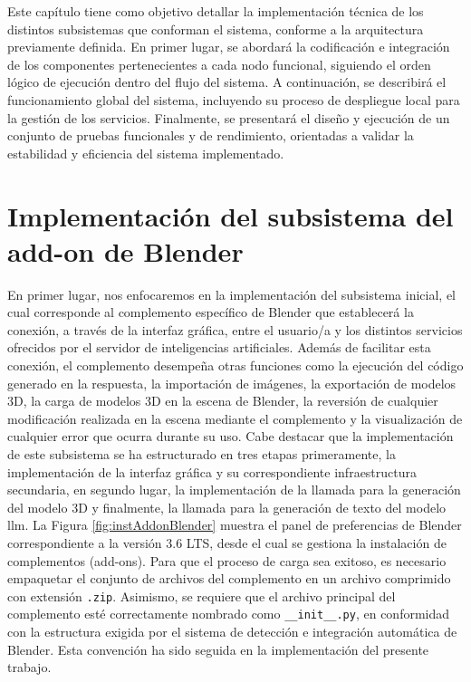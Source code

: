 Este capítulo tiene como objetivo detallar la implementación técnica de los distintos subsistemas que conforman el sistema, conforme a la arquitectura previamente definida. En primer lugar, se abordará la codificación e integración de los componentes pertenecientes a cada nodo funcional, siguiendo el orden lógico de ejecución dentro del flujo del sistema. A continuación, se describirá el funcionamiento global del sistema, incluyendo su proceso de despliegue local para la gestión de los servicios. Finalmente, se presentará el diseño y ejecución de un conjunto de pruebas funcionales y de rendimiento, orientadas a validar la estabilidad y eficiencia del sistema implementado.


\section{Implementación del subsistema del add-on de Blender}
En primer lugar, nos enfocaremos en la implementación del subsistema inicial, el cual corresponde al complemento específico de Blender que establecerá la conexión, a través de la interfaz gráfica, entre el usuario/a y los distintos servicios ofrecidos por el servidor de inteligencias artificiales. Además de facilitar esta conexión, el complemento desempeña otras funciones como la ejecución del código generado en la respuesta, la importación de imágenes, la exportación de modelos 3D, la carga de modelos 3D en la escena de Blender, la reversión de cualquier modificación realizada en la escena mediante el complemento y la visualización de cualquier error que ocurra durante su uso. Cabe destacar que la implementación de este subsistema se ha estructurado en tres etapas primeramente, la implementación de la interfaz gráfica y su correspondiente infraestructura secundaria, en segundo lugar, la implementación de la llamada para la generación del modelo 3D y finalmente, la llamada para la generación de texto del modelo \gls{llm}.
La Figura \ref{fig:instAddonBlender} muestra el panel de preferencias de Blender correspondiente a la versión 3.6 LTS, desde el cual se gestiona la instalación de complementos (add-ons). Para que el proceso de carga sea exitoso, es necesario empaquetar el conjunto de archivos del complemento en un archivo comprimido con extensión \verb|.zip|. Asimismo, se requiere que el archivo principal del complemento esté correctamente nombrado como \verb|__init__.py|, en conformidad con la estructura exigida por el sistema de detección e integración automática de Blender. Esta convención ha sido seguida en la implementación del presente trabajo.

